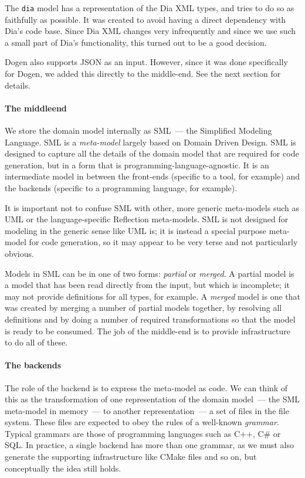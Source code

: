 \documentclass{book}
\begin{document}
The \texttt{dia} model has a representation of the Dia XML types, and
tries to do so as faithfully as possible. It was created to avoid
having a direct dependency with Dia's code base. Since Dia XML changes
very infrequently and since we use such a small part of Dia's
functionality, this turned out to be a good decision.

Dogen also supports JSON as an input. However, since it was done
specifically for Dogen, we added this directly to the middle-end. See
the next section for details.

\paragraph{The middleend}

We store the domain model internally as SML~--- the Simplified
Modeling Language. SML is a \emph{meta-model} largely based on Domain
Driven Design. SML is designed to capture all the details of the
domain model that are required for code generation, but in a form that
is programming-language-agnostic. It is an intermediate model in
between the front-ends (specific to a tool, for example) and the
backends (specific to a programming language, for example).

It is important not to confuse SML with other, more generic
meta-models such as UML or the language-specific Reflection
meta-models. SML is not designed for modeling in the generic sense
like UML is; it is instead a special purpose meta-model for code
generation, so it may appear to be very terse and not particularly
obvious.

Models in SML can be in one of two forms: \emph{partial} or
\emph{merged}. A partial model is a model that has been read directly
from the input, but which is incomplete; it may not provide
definitions for all types, for example. A \emph{merged} model is one
that was created by merging a number of partial models together, by
resolving all definitions and by doing a number of required
transformations so that the model is ready to be consumed. The job of
the middle-end is to provide infrastructure to do all of these.

\paragraph{The backends}

The role of the backend is to express the meta-model as code. We can
think of this as the transformation of one representation of the
domain model~--- the SML meta-model in memory~--- to another
representation~--- a set of files in the file system. These files are
expected to obey the rules of a well-known \emph{grammar}. Typical
grammars are those of programming languages such as C++, C\# or
SQL. In practice, a single backend has more than one grammar, as we
must also generate the supporting infrastructure like CMake files and
so on, but conceptually the idea still holds.
\end{document}
